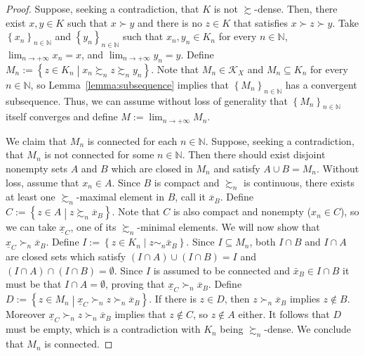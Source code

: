 \documentclass[12pt, oneside]{amsart}
\theoremstyle{definition}
\begin{document}
\begin{proof}
Suppose, seeking a contradiction, that $K$ is not $\succsim$-dense. Then, there exist $x, y \in K$ such that $x \succ y$ and there is no $z \in K$ that satisfies $x \succ z \succ y$. Take $\left\{x_n\right\}_{n \in \mathbb{N}}$ and $\left\{y_n\right\}_{n \in \mathbb{N}}$ such that $x_n, y_n \in K_n$ for every $n \in \mathbb{N}$, $\lim_{n \to +\infty} x_n = x$, and $\lim_{n \to +\infty} y_n = y$. Define $M_n := \left\{ z \in K_n \middle| x_n \succsim_n z \succsim_n y_n \right\}$. Note that $M_n \in \mathcal{K}_X$ and $M_n \subseteq K_n$ for every $n \in \mathbb{N}$, so Lemma~\ref{lemma:subsequence} implies that $\left\{M_n\right\}_{n \in \mathbb{N}}$ has a convergent subsequence. Thus, we can assume without loss of generality that $\left\{M_n\right\}_{n \in \mathbb{N}}$ itself converges and define $M := \lim_{n \to +\infty} M_n$. 
		
We claim that $M_n$ is connected for each $n \in \mathbb{N}$. Suppose, seeking a contradiction, that $M_n$ is not connected for some $n \in \mathbb{N}$. Then there should exist disjoint nonempty sets $A$ and $B$ which are closed in $M_n$ and satisfy $A \cup B = M_n$. Without loss, assume that $x_n  \in A$. Since $B$ is compact and $\succsim_n$ is continuous, there exists at least one $\succsim_n$-maximal element in $B$, call it $\overline{x}_B$. Define $C := \left\{ z \in A \middle| z \succsim_n \overline{x}_B \right\}$. Note that $C$ is also compact and nonempty ($x_n \in C$), so we can take $\underline{x}_C$, one of its $\succsim_n$-minimal elements. We will now show that $\underline{x}_C \succ_n \overline{x}_B$. Define $I := \left\{ z \in K_n \middle| z \sim_n \bar{x}_B \right\}$. Since $I \subseteq M_n$, both $I \cap B$ and $I \cap A$ are closed sets which satisfy $\left(I \cap A\right) \cup \left(I \cap B\right) = I$ and $\left(I \cap A\right) \cap \left(I \cap B\right) = \emptyset$. Since $I$ is assumed to be connected and $\bar{x}_B \in I \cap B$ it must be that $I \cap A = \emptyset$, proving that $\underline{x}_C \succ_n \overline{x}_B$. Define $D := \left\{ z \in M_n \middle| \underline{x}_C \succ_n z \succ_n \overline{x}_B \right\}$. If there is $z \in D$, then $z \succ_n \overline{x}_B$ implies $z \notin B$. Moreover $\underline{x}_C \succ_n z \succ_n \overline{x}_B$ implies that $z \not \in C$, so $z \not \in A$ either. It follows that $D$ must be empty, which is a contradiction with $K_n$ being $\succsim_n$-dense. We conclude that $M_n$ is connected.
		

\end{proof}
\end{document}

